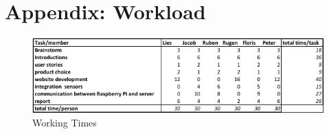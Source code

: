\section{Appendix: Workload}
\begin{figure}[H]
  \center
  \includegraphics[width=1.5\linewidth, angle=90]{./appendix_working_times/workload.png}
  \caption{Working Times}
  \label{image:workload}
\end{figure}
